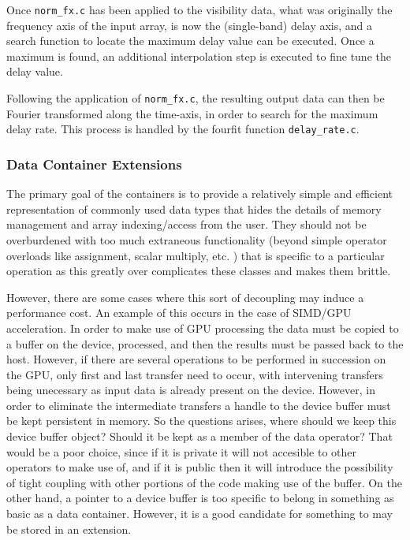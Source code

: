 Once \texttt{norm\_fx.c} has been applied to the visibility data, what was originally the frequency axis of the input array, is now the (single-band) delay axis, and a search function to locate the maximum delay value can be executed. Once a maximum is found, an additional interpolation step is executed to fine tune the delay value.

Following the application of \texttt{norm\_fx.c}, the resulting output data can then be Fourier transformed along the time-axis, in order to search
for the maximum delay rate. This process is handled by the fourfit function \texttt{delay\_rate.c}.




\subsubsection{Data Container Extensions}

The primary goal of the containers is to provide a relatively simple and efficient representation of commonly used data types that hides the details of memory management and array indexing/access from the user. They should not be overburdened with too much extraneous functionality (beyond simple operator overloads like assignment, scalar multiply, etc. ) that is specific to a particular operation as this greatly
over complicates these classes and makes them brittle. 

However, there are some cases where this sort of decoupling may induce a performance cost. An example of
this occurs in the case of SIMD/GPU acceleration. In order to make use of GPU processing the data must be copied to a buffer on the device, processed, and then the results must be passed back to the host. However, if there are several operations to be performed in succession on the GPU, only first and last transfer need to occur, with intervening transfers being unecessary as input data is already present on the device. However, in order to eliminate the intermediate transfers a handle to the device buffer must be kept persistent in memory. So the questions arises, where should we keep this device buffer object? Should it be kept as a member of the data operator? That would be a poor choice, since if it is private it will not accesible to other operators to make use of, and if it is public then it will introduce the possibility of tight coupling with other portions of the code making use of the buffer. On the other hand, a pointer to a device buffer is too specific to belong in something as basic as a data container. However, it is a good candidate for something to may be stored in an extension.

